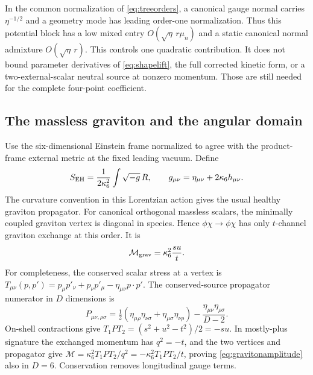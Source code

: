 In the common normalization of \eqref{eq:treeorders}, a canonical
gauge normal carries $\eta^{-1/2}$ and a geometry mode has leading
order-one normalization. Thus this potential block has a low mixed
entry $O(\sqrt\eta\,r\mu_n)$ and a static canonical normal
admixture $O(\sqrt\eta\,r)$. This controls one quadratic contribution.
It does not bound parameter derivatives of \eqref{eq:shapelift},
the full corrected kinetic form, or a two-external-scalar neutral
source at nonzero momentum. Those are still needed for the complete
four-point coefficient.

\subsection{The massless graviton and the angular domain}
Use the six-dimensional Einstein frame normalized to agree with the
product-frame external metric at the fixed leading vacuum. Define
\begin{equation}\label{eq:Einsteinnormalization}
 S_{\rm EH}=\frac1{2\kappa_6^2}\int\sqrt{-g}\,R,
 \qquad g_{\mu\nu}=\eta_{\mu\nu}+2\kappa_6h_{\mu\nu}.
\end{equation}
The curvature convention in this Lorentzian action gives the usual
healthy graviton propagator. For canonical orthogonal massless scalars,
the minimally coupled graviton vertex is diagonal in species. Hence
$\phi\chi\to\phi\chi$ has only $t$-channel graviton exchange at
this order. It is
\begin{equation}\label{eq:gravitonamplitude}
 \mathcal M_{\rm grav}=\kappa_6^2\frac{su}{t}.
\end{equation}
For completeness, the conserved scalar stress at a vertex is
$T_{\mu\nu}(p,p')=p_\mu p'_\nu+p_\nu p'_\mu-\eta_{\mu\nu}p\cdot p'$.
The conserved-source propagator numerator in $D$ dimensions is
\[
 P_{\mu\nu,\rho\sigma}
 =\tfrac12(\eta_{\mu\rho}\eta_{\nu\sigma}
           +\eta_{\mu\sigma}\eta_{\nu\rho})
       -\frac{\eta_{\mu\nu}\eta_{\rho\sigma}}{D-2}.
\]
On-shell contractions give
$T_1PT_2=(s^2+u^2-t^2)/2=-su$. In mostly-plus signature the exchanged
momentum has $q^2=-t$, and the two vertices and propagator give
$\mathcal M=\kappa_6^2T_1PT_2/q^2=-\kappa_6^2T_1PT_2/t$, proving
\eqref{eq:gravitonamplitude} also in $D=6$. Conservation removes
longitudinal gauge terms.

